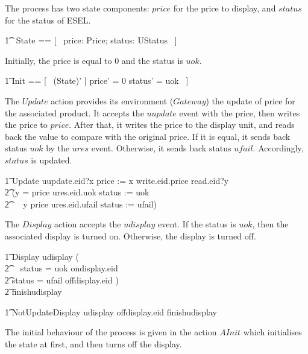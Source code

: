 The process has two state components: $price$ for the price to display, and $status$ for the status of ESEL.
\begin{circusaction}
    	\t1 \circstate\ State == [~ price: Price; status: UStatus ~] \\
\end{circusaction}
Initially, the price is equal to 0 and the status is $uok$.
\begin{zed}
    	\t1	Init == [~ (State)' | price' = 0 \land status' = uok ~] \\
\end{zed}
The $Update$ action provides its environment ($Gateway$) the update of price for the associated product. It accepts the $uupdate$ event with the price, then writes the price to $price$. After that, it writes the price to the display unit, and reads back the value to compare with the original price. If it is equal, it sends back status $uok$ by the $ures$ event. Otherwise, it sends back status $ufail$. Accordingly, $status$ is updated.
\begin{circusaction}
        \t1 Update \circdef uupdate.eid?x \then price := x \circseq write.eid.price \then read.eid?y \\
            \t2 \then (\lcircguard y = price \rcircguard \circguard ures.eid.uok \then status := uok \\
            \t2 \,\,\,\,\,\, \extchoice \lcircguard y \neq price \rcircguard \circguard ures.eid.ufail \then status := ufail) \\
\end{circusaction}
The $Display$ action accepts the $udisplay$ event. If the status is $uok$, then the associated display is turned on. Otherwise, the display is turned off.
\begin{circusaction}
        \t1 Display \circdef udisplay \then (\\
            \t2 \,\,\,\, \lcircguard status = uok \rcircguard \circguard ondisplay.eid \then \Skip \\
            \t2 \extchoice \lcircguard status = ufail \rcircguard \circguard offdisplay.eid \then \Skip) \\
            \t2 \circseq finishudisplay \then \Skip
\end{circusaction}
\begin{circusaction}
        \t1 NotUpdateDisplay \circdef udisplay \then offdisplay.eid \then finishudisplay \then \Skip \\
\end{circusaction}
The initial behaviour of the process is given in the action $AInit$ which initialises the state at first, and then turns off the display.
